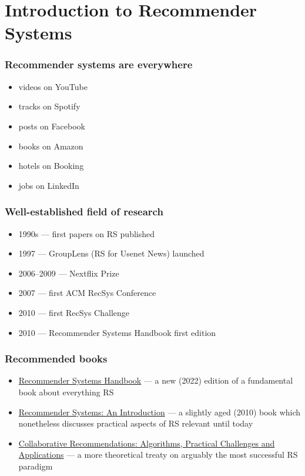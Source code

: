\documentclass[t]{beamer}
\begin{document}
\section{Introduction to Recommender Systems}
\begin{frame}
  \frametitle{Recommender systems are everywhere}
  \begin{itemize}
  \item videos on YouTube
  \item tracks on Spotify
  \item posts on Facebook
  \item books on Amazon
  \item hotels on Booking
  \item jobs on LinkedIn
  \end{itemize}
\end{frame}
\begin{frame}
  \frametitle{Well-established field of research}
  \begin{itemize}
  \item 1990s --- first papers on RS published
  \item 1997 --- GroupLens (RS for Usenet News) launched
  \item 2006–2009 --- Nextflix Prize
  \item 2007 --- first ACM RecSys Conference
  \item 2010 --- first RecSys Challenge
  \item 2010 --- Recommender Systems Handbook first edition
  \end{itemize}
\end{frame}
\begin{frame}
  \frametitle{Recommended books}
  \begin{itemize}
  \item \href{https://doi.org/10.1007/978-1-0716-2197-4}{Recommender Systems Handbook} --- a new (2022) edition of a fundamental book about everything RS
  \item \href{https://doi.org/10.1017/CBO9780511763113}{Recommender Systems: An Introduction} --- a slightly aged (2010) book which nonetheless discusses practical aspects of RS relevant until today
  \item \href{https://www.amazon.com/Collaborative-Recommendations-Algorithms-Challenges-Applications/dp/9813275340}{Collaborative Recommendations: Algorithms, Practical Challenges and Applications} --- a more theoretical treaty on arguably the most successful RS paradigm
  \end{itemize}
\end{frame}
\end{document}
